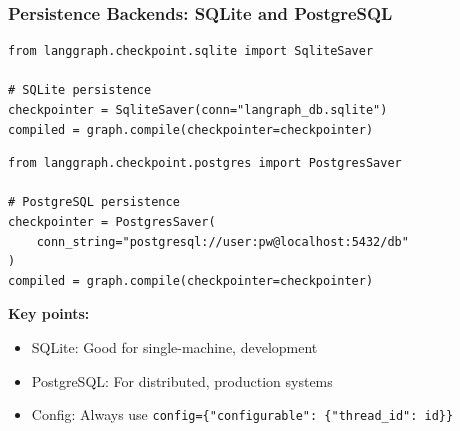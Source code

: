 \documentclass[aspectratio=169,11pt]{beamer}
\begin{document}
\begin{frame}[fragile]
\frametitle{Persistence Backends: SQLite and PostgreSQL}
\begin{lstlisting}
from langgraph.checkpoint.sqlite import SqliteSaver

# SQLite persistence
checkpointer = SqliteSaver(conn="langraph_db.sqlite")
compiled = graph.compile(checkpointer=checkpointer)
\end{lstlisting}

\vspace{10pt}
\begin{lstlisting}
from langgraph.checkpoint.postgres import PostgresSaver

# PostgreSQL persistence
checkpointer = PostgresSaver(
    conn_string="postgresql://user:pw@localhost:5432/db"
)
compiled = graph.compile(checkpointer=checkpointer)
\end{lstlisting}

\vspace{10pt}
\textbf{Key points:}
\begin{itemize}
    \setlength{\itemsep}{1pt}
  \item SQLite: Good for single-machine, development
  \item PostgreSQL: For distributed, production systems
  \item Config: Always use \texttt{config=\{"configurable": \{"thread\_id": id\}\}}
\end{itemize}
\end{frame}
\end{document}
